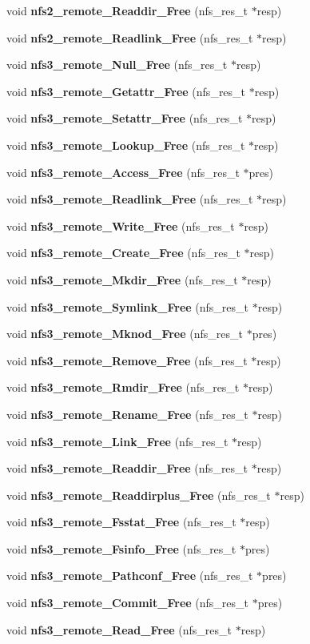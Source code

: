 \begin{CompactItemize}
void {\bf nfs2\_\-remote\_\-Readdir\_\-Free} (nfs\_\-res\_\-t $\ast$resp)
\item 
void {\bf nfs2\_\-remote\_\-Readlink\_\-Free} (nfs\_\-res\_\-t $\ast$resp)
\item 
void {\bf nfs3\_\-remote\_\-Null\_\-Free} (nfs\_\-res\_\-t $\ast$resp)
\item 
void {\bf nfs3\_\-remote\_\-Getattr\_\-Free} (nfs\_\-res\_\-t $\ast$resp)
\item 
void {\bf nfs3\_\-remote\_\-Setattr\_\-Free} (nfs\_\-res\_\-t $\ast$resp)
\item 
void {\bf nfs3\_\-remote\_\-Lookup\_\-Free} (nfs\_\-res\_\-t $\ast$resp)
\item 
void {\bf nfs3\_\-remote\_\-Access\_\-Free} (nfs\_\-res\_\-t $\ast$pres)
\item 
void {\bf nfs3\_\-remote\_\-Readlink\_\-Free} (nfs\_\-res\_\-t $\ast$resp)
\item 
void {\bf nfs3\_\-remote\_\-Write\_\-Free} (nfs\_\-res\_\-t $\ast$resp)
\item 
void {\bf nfs3\_\-remote\_\-Create\_\-Free} (nfs\_\-res\_\-t $\ast$resp)
\item 
void {\bf nfs3\_\-remote\_\-Mkdir\_\-Free} (nfs\_\-res\_\-t $\ast$resp)
\item 
void {\bf nfs3\_\-remote\_\-Symlink\_\-Free} (nfs\_\-res\_\-t $\ast$resp)
\item 
void {\bf nfs3\_\-remote\_\-Mknod\_\-Free} (nfs\_\-res\_\-t $\ast$pres)
\item 
void {\bf nfs3\_\-remote\_\-Remove\_\-Free} (nfs\_\-res\_\-t $\ast$resp)
\item 
void {\bf nfs3\_\-remote\_\-Rmdir\_\-Free} (nfs\_\-res\_\-t $\ast$resp)
\item 
void {\bf nfs3\_\-remote\_\-Rename\_\-Free} (nfs\_\-res\_\-t $\ast$resp)
\item 
void {\bf nfs3\_\-remote\_\-Link\_\-Free} (nfs\_\-res\_\-t $\ast$resp)
\item 
void {\bf nfs3\_\-remote\_\-Readdir\_\-Free} (nfs\_\-res\_\-t $\ast$resp)
\item 
void {\bf nfs3\_\-remote\_\-Readdirplus\_\-Free} (nfs\_\-res\_\-t $\ast$resp)
\item 
void {\bf nfs3\_\-remote\_\-Fsstat\_\-Free} (nfs\_\-res\_\-t $\ast$resp)
\item 
void {\bf nfs3\_\-remote\_\-Fsinfo\_\-Free} (nfs\_\-res\_\-t $\ast$pres)
\item 
void {\bf nfs3\_\-remote\_\-Pathconf\_\-Free} (nfs\_\-res\_\-t $\ast$pres)
\item 
void {\bf nfs3\_\-remote\_\-Commit\_\-Free} (nfs\_\-res\_\-t $\ast$pres)
\item 
void {\bf nfs3\_\-remote\_\-Read\_\-Free} (nfs\_\-res\_\-t $\ast$resp)
\end{CompactItemize}


